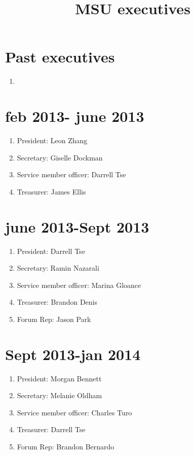 \documentclass[12pt]{amsart}
\begin{document}
\title{MSU executives}

\maketitle
\section*{Past executives}
\begin{flushleft}
\begin{enumerate}[label=(\alph*)]
\item 
\end{enumerate}

\section*{feb 2013- june 2013}


\begin{enumerate}[label=(\alph*)]
\item President: Leon Zhang
\item Secretary: Giselle Dockman
\item Service member officer: Darrell Tse
\item Treasurer: James Ellis
\end{enumerate}

\section*{june 2013-Sept 2013}

\begin{enumerate}[label=(\alph*)]
\item President: Darrell Tse
\item Secretary: Ramin Nazarali
\item Service member officer: Marina Gloance
\item Treasurer: Brandon Denis
\item Forum Rep: Jason Park
\end{enumerate}


\section*{Sept 2013-jan 2014}

\begin{enumerate}[label=(\alph*)]
\item President: Morgan Bennett
\item Secretary: Melanie Oldham
\item Service member officer: Charles Turo
\item Treasurer: Darrell Tse
\item Forum Rep: Brandon Bernardo
\end{enumerate}


\end{flushleft}
\end{document}
